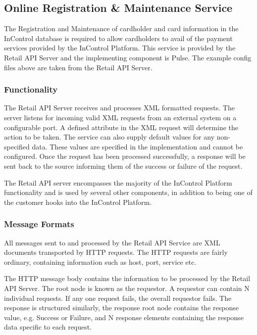 \documentclass[a4paper, 11pt, titlepage]{article}
\begin{document}
\subsection{Online Registration \& Maintenance Service} 
The Registration and Maintenance of cardholder and card information in the InControl database is required to allow cardholders to avail of the payment services provided by the InControl Platform. This service is provided by the Retail API Server and the implementing component is Pulse. The example config files above are taken from the Retail API Server. 
 
\subsubsection{Functionality}
\label{default_retail_values} 
The Retail API Server receives and processes XML formatted requests. The server listens for incoming valid XML requests from an external system on a configurable port. A defined attribute in the XML request will determine the action to be taken. The service can also supply default values for any non-specified data. These values are specified in the implementation and cannot be configured. 
Once the request has been processed successfully, a response will be sent back to the source informing them of the success or failure of the request. 

The Retail API server encompasses the majority of the InControl Platform functionality and is used by several other components, in addition to being one of the customer hooks into the InControl Platform. 
\subsubsection{Message Formats} 
All messages sent to and processed by the Retail API Service are XML documents transported by HTTP requests. The HTTP requests are fairly ordinary, containing information such as host, port, service etc. 
 
The HTTP message body contains the information to be processed by the Retail API Server. The root node is known as the requestor. A requestor can contain N individual requests. If any one request fails, the overall requestor fails. The response is structured similarly, the response root node contains the response value, e.g. Success or Failure, and N response elements containing the response data specific to each request. 
 
\end{document}
